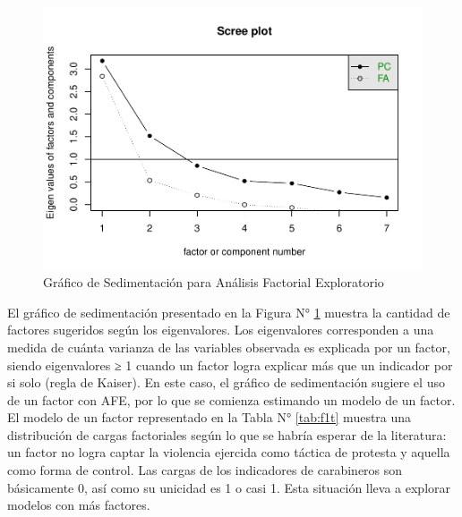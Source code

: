 \documentclass[12pt,twoside]{templates/facsothesis}
\begin{document}
\begin{figure}[!ht]

{\centering \includegraphics[width=1\linewidth,]{tesis_files/figure-latex/scree-1} 

}

\caption{Gráfico de Sedimentación para Análisis Factorial Exploratorio}\label{fig:scree}
\end{figure}

El gráfico de sedimentación presentado en la Figura N° \ref{fig:scree} muestra la cantidad de factores sugeridos según los eigenvalores. Los eigenvalores corresponden a una medida de cuánta varianza de las variables observada es explicada por un factor, siendo eigenvalores ≥ 1 cuando un factor logra explicar más que un indicador por si solo (regla de Kaiser). En este caso, el gráfico de sedimentación sugiere el uso de un factor con AFE, por lo que se comienza estimando un modelo de un factor. El modelo de un factor representado en la Tabla N° \ref{tab:f1t} muestra una distribución de cargas factoriales según lo que se habría esperar de la literatura: un factor no logra captar la violencia ejercida como táctica de protesta y aquella como forma de control. Las cargas de los indicadores de carabineros son básicamente 0, así como su unicidad es 1 o casi 1. Esta situación lleva a explorar modelos con más factores.
\end{document}

